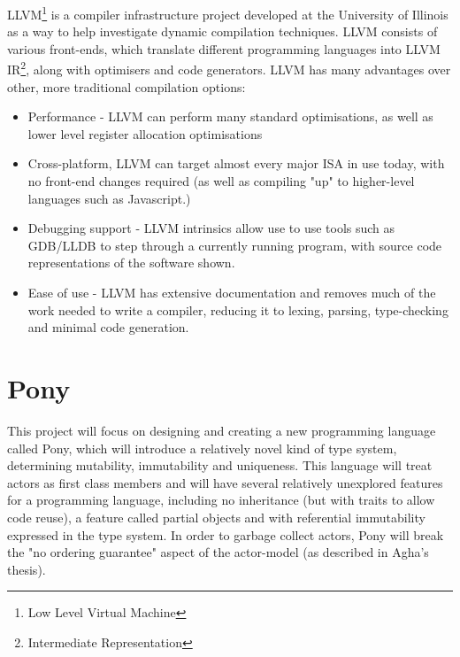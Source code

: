 \documentclass[pdftex,11pt,a4paper]{report}
\begin{document}
LLVM\footnote{Low Level Virtual Machine} is a compiler infrastructure project developed at the University of Illinois as a way to help investigate dynamic compilation techniques\cite{Lattner:MSThesis02}.
LLVM consists of various front-ends, which translate different programming languages into LLVM IR\footnote{Intermediate Representation}, along with optimisers and code generators.
LLVM has many advantages over other, more traditional compilation options:
\begin{itemize}[noitemsep]
\item Performance - LLVM can perform many standard optimisations, as well as lower level register allocation optimisations
\item Cross-platform, LLVM can target almost every major ISA in use today\cite{llvm-svn}, with no front-end changes required (as well as compiling "up" to higher-level languages such as Javascript.)
\item Debugging support - LLVM intrinsics allow use to use tools such as GDB/LLDB to step through a currently running program, with source code representations of the software shown.
\item Ease of use - LLVM has extensive documentation and removes much of the work needed to write a compiler, reducing it to lexing, parsing, type-checking and minimal code generation.
\end{itemize}

\newpage
\chapter{Pony}
\label{chapter:pony}

This project will focus on designing and creating a new programming language called Pony, which will introduce a relatively novel kind of type system, determining mutability, immutability and uniqueness.
This language will treat actors as first class members and will have several relatively unexplored features for a programming language, including no inheritance (but with traits to allow code reuse), a feature called partial objects and with referential immutability expressed in the type system.
In order to garbage collect actors, Pony will break the "no ordering guarantee" aspect of the actor-model (as described in Agha's thesis\cite{agha1985}).
\end{document}
